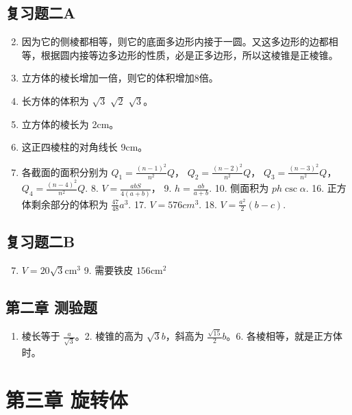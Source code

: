 \subsection{复习题二A}

\begin{enumerate}
\setcounter{enumi}{1}
\item
  因为它的侧棱都相等，则它的底面多边形内接于一圆。又这多边形的边都相等，根据圆内接等边多边形的性质，必是正多边形，所以这棱锥是正棱锥。
\item
  立方体的棱长增加一倍，则它的体积增加8倍。
\item
  长方体的体积为 \(\sqrt{3}\) \(\sqrt{2}\) \(\sqrt{3}\)。
\item
  立方体的棱长为 2cm。
\item
  这正四棱柱的对角线长 9cm。
\item
  各截面的面积分别为 \(Q_{1} = \frac{(n - 1)^{2}}{n^{2}} Q\)，
  \(Q_{2} = \frac{(n - 2)^{2}}{n^{2}} Q\)，
  \(Q_{3} = \frac{(n - 3)^{2}}{n^{2}} Q\)，
  \(Q_{4} = \frac{(n - 4)^{2}}{n^{2}} Q\). 8.
  \(V = \frac{abS}{4(a + b)}\)， 9. \(h = \frac{ab}{a + b}\). 10.
  侧面积为 \(ph \csc \alpha\). 16. 正方体剩余部分的体积为
  \(\frac{47}{48} a^{3}\). 17. \(V = 576cm^{3}\). 18.
  \(V = \frac{a^{2}}{2}(b - c)\).
\end{enumerate}

\subsection{复习题二B}

\begin{enumerate}
\setcounter{enumi}{6}
\item
  \(V = 20\sqrt{3}\mathrm{cm}^3\) 9. 需要铁皮 \(156\mathrm{cm}^2\)
\end{enumerate}

\subsection{第二章
测验题}

\begin{enumerate}
\item
  棱长等于 \(\frac{a}{\sqrt{3}}\)。2. 棱锥的高为 \(\sqrt{3} b\)，斜高为
  \(\frac{\sqrt{15}}{2} b\)。6. 各棱相等，就是正方体时。
\end{enumerate}

\section{第三章 旋转体}

